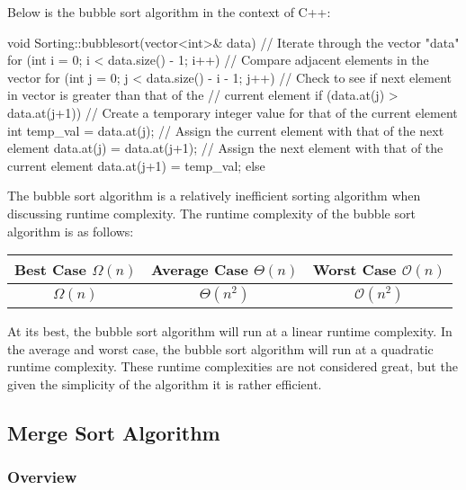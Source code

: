\begin{highlight}

Below is the bubble sort algorithm in the context of C++:

\begin{code}
void Sorting::bubblesort(vector<int>& data){
// Iterate through the vector "data"
for (int i = 0; i < data.size() - 1; i++) {
    // Compare adjacent elements in the vector
    for (int j = 0; j < data.size() - i - 1; j++) {
        // Check to see if next element in vector is greater than that of the 
        // current element
        if (data.at(j) > data.at(j+1)) {
            // Create a temporary integer value for that of the current element
            int temp_val = data.at(j);
            // Assign the current element with that of the next element
            data.at(j) = data.at(j+1);
            // Assign the next element with that of the current element
            data.at(j+1) = temp_val;
        }
        else {}
        }
    }
}
\end{code}

The bubble sort algorithm is a relatively inefficient sorting algorithm when discussing runtime complexity. The runtime complexity of the bubble sort algorithm is as follows:

\begin{center}
    \begin{tabular}{|c|c|c|}
        \hline \textbf{Best Case $\Omega(n)$} & \textbf{Average Case $\Theta(n)$} & \textbf{Worst Case $\mathcal{O}(n)$} \\ \hline
        $\Omega(n)$ & $\Theta(n^2)$ & $\mathcal{O}(n^2)$ \\ \hline
    \end{tabular}
\end{center}

\noindent At its best, the bubble sort algorithm will run at a linear runtime complexity. In the average and worst case, the bubble sort algorithm will run at a quadratic runtime complexity. These runtime complexities are not considered great, but the given the simplicity of the algorithm it is rather efficient.

\end{highlight}

\subsection*{Merge Sort Algorithm}

\subsubsection*{Overview}

